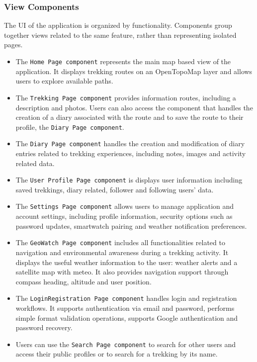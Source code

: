 










\subsubsection{View Components}
The UI of the application is organized by functionality. Components group together views related to the same feature, rather than representing isolated pages.
\begin{itemize}
\item The \texttt{Home Page component} represents the main map based view of the application. It displays trekking routes on an OpenTopoMap layer and allows users to explore available paths.
\item The \texttt{Trekking Page component} provides information routes, including a description and photos. Users can also access the component that handles the creation of a diary associated with the route and to save the route to their profile, the \texttt{Diary Page component}.
\item The \texttt{Diary Page component} handles the creation and modification of diary entries related to trekking experiences, including notes, images and activity related data.
\item The \texttt{User Profile Page component} is displays user information including saved trekkings, diary related, follower and following users' data.
\item The \texttt{Settings Page component} allows users to manage application and account settings, including profile information, security options such as password updates, smartwatch pairing and weather notification preferences.
\item The \texttt{GeoWatch Page component} includes all functionalities related to navigation and environmental awareness during a trekking activity. It displays the useful weather information to the user: weather alerts and a satellite map with meteo. It also provides navigation support through compass heading, altitude and user position.
\item The \texttt{LoginRegistration Page component} handles login and registration workflows. It supports authentication via email and password, performs simple format validation operations, supports Google authentication and password recovery.
\item Users can use the \texttt{Search Page component} to search for other users and access their public profiles or to search for a trekking by its name.
\end{itemize}





